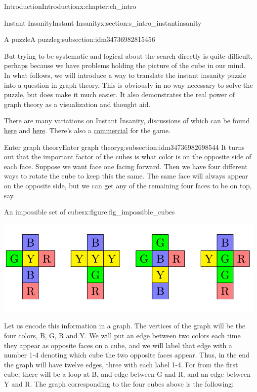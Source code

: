 \documentclass[oneside,10pt,]{book}
\numberwithin{equation}{section}
\begin{document}
\begin{chapterptx}{Introduction}{}{Introduction}{}{}{x:chapter:ch_intro}
\begin{sectionptx}{Instant Insanity}{}{Instant Insanity}{}{}{x:section:s_intro_instantinsanity}
\begin{subsectionptx}{A puzzle}{}{A puzzle}{}{}{g:subsection:idm34736982815456}
\par
But trying to be systematic and logical about the search directly is quite difficult, perhaps because we have problems holding the picture of the cube in our mind.  In what follows, we will introduce a way to translate the instant insanity puzzle into a question in graph theory.  This is obviously in no way necessary to solve the puzzle, but does make it much easier.  It also demonstrates the real power of graph theory as a visualization and thought aid.%
\par
There are many variations on Instant Insanity, discussions of which can be found \href{http://www.cs.brandeis.edu/\~storer/JimPuzzles/ZPAGES/zzzInstantInsanity.html}{here} and \href{http://www.jaapsch.net/puzzles/insanity.htm}{here}. There’s also a \href{https://www.youtube.com/watch?v=CQ2gHSKZBEw}{commercial} for the game.%
\end{subsectionptx}
%
%
\typeout{************************************************}
\typeout{************************************************}
%
\begin{subsectionptx}{Enter graph theory}{}{Enter graph theory}{}{}{g:subsection:idm34736982698544}
It turns out that the important factor of the cubes is what color is on the opposite side of each face.  Suppose we want face one facing forward.  Then we have four different ways to rotate the cube to keep this the same.  The same face will always appear on the opposite side, but we can get any of the remaining four faces to be on top, say.%
\begin{figureptx}{An impossible set of cubes}{x:figure:fig_impossible_cubes}{}%
\begin{image}{0}{1}{0}%
\includegraphics[width=\linewidth]{images/ImpossibleCubes.png}
\end{image}%
\tcblower
\end{figureptx}%
Let us encode this information in a graph.   The vertices of the graph will be the four colors, B, G, R and Y. We will put an edge between two colors each time they appear as opposite faces on a cube, and we will label that edge with a number 1-4 denoting which cube the two opposite faces appear. Thus, in the end the graph will have twelve edges, three with each label 1-4. For from the first cube, there will be a loop at B, and edge between G and R, and an edge between Y and R.  The graph corresponding to the four cubes above is the following:%

\end{subsectionptx}
\end{sectionptx}
\end{chapterptx}
\end{document}
